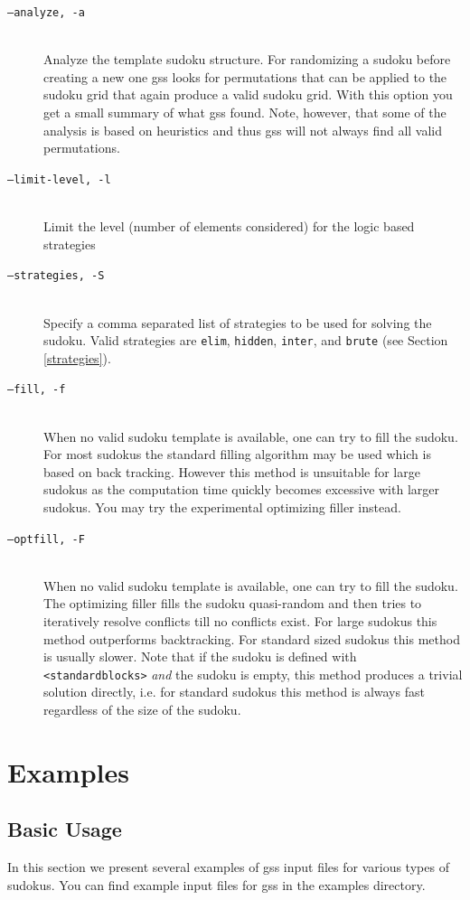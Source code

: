 \documentclass[12pt]{article}
\begin{document}
\begin{description}
\item [\texttt{--analyze, -a}] \hfill \\ Analyze the template sudoku structure. For randomizing a sudoku before creating a new one gss looks for permutations that can be applied to the sudoku grid that again produce a valid sudoku grid. With this option you get a small summary of what gss found. Note, however, that some of the analysis is based on heuristics and thus gss will not always find all valid permutations.
\item [\texttt{--limit-level, -l}] \hfill \\ Limit the level (number of elements considered) for the logic based strategies
\item [\texttt{--strategies, -S}] \hfill \\ Specify a comma separated list of strategies to be used for solving the sudoku. Valid strategies are \texttt{elim}, \texttt{hidden}, \texttt{inter}, and \texttt{brute} (see Section \ref{strategies}). 
\item [\texttt{--fill, -f}] \hfill \\ When no valid sudoku template is available, one can try to fill the sudoku. For most sudokus the standard filling algorithm may be used which is based on back tracking. However this method is unsuitable for large sudokus as the computation time quickly becomes excessive with larger sudokus. You may try the experimental optimizing filler instead.
\item [\texttt{--optfill, -F}] \hfill \\ When no valid sudoku template is available, one can try to fill the sudoku. The optimizing filler fills the sudoku quasi-random and then tries to iteratively resolve conflicts till no conflicts exist. For large sudokus this method outperforms backtracking. For standard sized sudokus this method is usually slower. Note that if the sudoku is defined with \texttt{<standardblocks>} \emph{and} the sudoku is empty, this method produces a trivial solution directly, i.e. for standard sudokus this method is always fast regardless of the size of the sudoku. 
\end{description}

\section{\label{examples}Examples}
\subsection{Basic Usage}
In this section we present several examples of gss input files for various types of sudokus. You can find example input files for gss in the examples directory.
\end{document}
